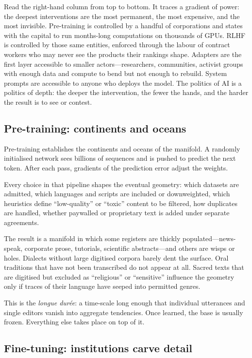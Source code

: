 Read the right-hand column from top to bottom. It traces a gradient of power: the deepest interventions are the most permanent, the most expensive, and the most invisible. Pre-training is controlled by a handful of corporations and states with the capital to run months-long computations on thousands of GPUs. RLHF is controlled by those same entities, enforced through the labour of contract workers who may never see the products their rankings shape. Adapters are the first layer accessible to smaller actors---researchers, communities, activist groups with enough data and compute to bend but not enough to rebuild. System prompts are accessible to anyone who deploys the model. The politics of AI is a politics of depth: the deeper the intervention, the fewer the hands, and the harder the result is to see or contest.

\subsection{Pre-training: continents and oceans}

Pre-training establishes the continents and oceans of the manifold. A randomly initialised network sees billions of sequences and is pushed to predict the next token. After each pass, gradients of the prediction error adjust the weights.

Every choice in that pipeline shapes the eventual geometry: which datasets are admitted, which languages and scripts are included or downweighted, which heuristics define ``low-quality'' or ``toxic'' content to be filtered, how duplicates are handled, whether paywalled or proprietary text is added under separate agreements.

The result is a manifold in which some registers are thickly populated---news-speak, corporate prose, tutorials, scientific abstracts---and others are wisps or holes. Dialects without large digitised corpora barely dent the surface. Oral traditions that have not been transcribed do not appear at all. Sacred texts that are digitised but excluded as ``religious'' or ``sensitive'' influence the geometry only if traces of their language have seeped into permitted genres.

This is the \emph{longue dur\'{e}e}: a time-scale long enough that individual utterances and single editors vanish into aggregate tendencies. Once learned, the base is usually frozen. Everything else takes place on top of it.

\subsection{Fine-tuning: institutions carve detail}

